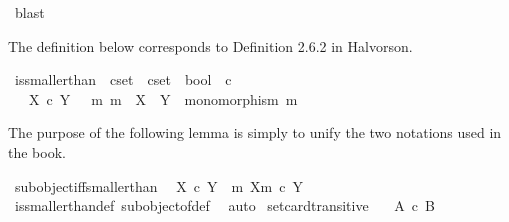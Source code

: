 \begin{isabellebody}
\ blast%
\endisatagproof
{\isafoldproof}%
%
\isadelimproof
%
\endisadelimproof
%
\begin{isamarkuptext}%
The definition below corresponds to Definition 2.6.2 in Halvorson.%
\end{isamarkuptext}\isamarkuptrue%
\isamarkupfalse%
\ is{\isacharunderscore}{\kern0pt}smaller{\isacharunderscore}{\kern0pt}than\ {\isacharcolon}{\kern0pt}{\isacharcolon}{\kern0pt}\ {\isachardoublequoteopen}cset\ {\isasymRightarrow}\ cset\ {\isasymRightarrow}\ bool{\isachardoublequoteclose}\ {\isacharparenleft}{\kern0pt}\ {\isachardoublequoteopen}{\isasymle}\isactrlsub c{\isachardoublequoteclose}\ {}{}{\isacharparenright}{\kern0pt}\ \isanewline
\ \ \ {\isachardoublequoteopen}X\ {\isasymle}\isactrlsub c\ Y\ {\isasymlongleftrightarrow}\ {\isacharparenleft}{\kern0pt}{\isasymexists}\ m{\isachardot}{\kern0pt}\ m\ {\isacharcolon}{\kern0pt}\ X\ {\isasymrightarrow}\ Y\ {\isasymand}\ monomorphism\ m{\isacharparenright}{\kern0pt}{\isachardoublequoteclose}%
\begin{isamarkuptext}%
The purpose of the following lemma is simply to unify the two notations used in the book.%
\end{isamarkuptext}\isamarkuptrue%
\isamarkupfalse%
\ subobject{\isacharunderscore}{\kern0pt}iff{\isacharunderscore}{\kern0pt}smaller{\isacharunderscore}{\kern0pt}than{\isacharcolon}{\kern0pt}\isanewline
\ \ {\isachardoublequoteopen}{\isacharparenleft}{\kern0pt}X\ {\isasymle}\isactrlsub c\ Y{\isacharparenright}{\kern0pt}\ {\isacharequal}{\kern0pt}\ {\isacharparenleft}{\kern0pt}{\isasymexists}m{\isachardot}{\kern0pt}\ {\isacharparenleft}{\kern0pt}X{\isacharcomma}{\kern0pt}m{\isacharparenright}{\kern0pt}\ {\isasymsubseteq}\isactrlsub c\ Y{\isacharparenright}{\kern0pt}{\isachardoublequoteclose}\isanewline
%
\isadelimproof
\ \ %
\endisadelimproof
%
\isatagproof
{}\isamarkupfalse%
\ is{\isacharunderscore}{\kern0pt}smaller{\isacharunderscore}{\kern0pt}than{\isacharunderscore}{\kern0pt}def\ subobject{\isacharunderscore}{\kern0pt}of{\isacharunderscore}{\kern0pt}def{}\ \isamarkupfalse%
\ auto%
\endisatagproof
{\isafoldproof}%
%
\isadelimproof
\isanewline
%
\endisadelimproof
\isanewline
{}\isamarkupfalse%
\ set{\isacharunderscore}{\kern0pt}card{\isacharunderscore}{\kern0pt}transitive{\isacharcolon}{\kern0pt}\isanewline
\ \ \ {\isachardoublequoteopen}A\ {\isasymle}\isactrlsub c\ B{\isachardoublequoteclose}\isanewline

\end{isabellebody}
